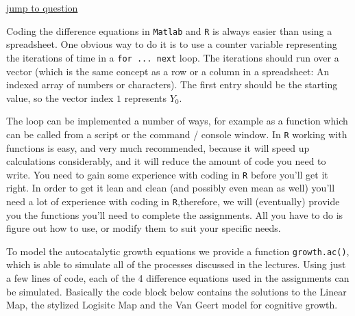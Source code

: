 \documentclass[]{book}
\begin{document}
\href{\%7B\#moc1R\%7D}{\textbar{} jump to question \textbar{}}

Coding the difference equations in \texttt{Matlab} and \texttt{R} is
always easier than using a spreadsheet. One obvious way to do it is to
use a counter variable representing the iterations of time in a
\texttt{for\ ...\ next} loop. The iterations should run over a vector
(which is the same concept as a row or a column in a spreadsheet: An
indexed array of numbers or characters). The first entry should be the
starting value, so the vector index \(1\) represents \(Y_0\).

The loop can be implemented a number of ways, for example as a function
which can be called from a script or the command / console window. In
\texttt{R} working with functions is easy, and very much recommended,
because it will speed up calculations considerably, and it will reduce
the amount of code you need to write. You need to gain some experience
with coding in \texttt{R} before you'll get it right. In order to get it
lean and clean (and possibly even mean as well) you'll need a lot of
experience with coding in \texttt{R},therefore, we will (eventually)
provide you the functions you'll need to complete the assignments. All
you have to do is figure out how to use, or modify them to suit your
specific needs.

To model the autocatalytic growth equations we provide a function
\texttt{growth.ac()}, which is able to simulate all of the processes
discussed in the lectures. Using just a few lines of code, each of the 4
difference equations used in the assignments can be simulated. Basically
the code block below contains the solutions to the Linear Map, the
stylized Logisitc Map and the Van Geert model for cognitive growth.
\end{document}
